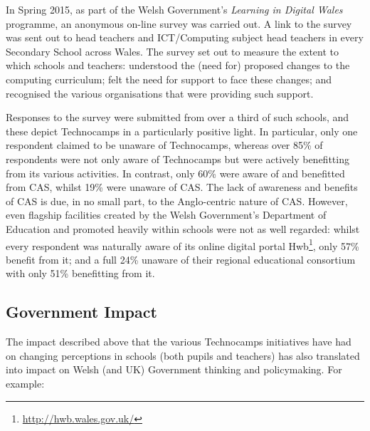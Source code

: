 \documentclass{llncs}
\begin{document}
In Spring 2015, as part of the Welsh Government's
\emph{Learning in Digital Wales} programme,
an anonymous on-line survey was carried out.
A link to the survey %
was sent out to head teachers and ICT/Computing subject head teachers
in every Secondary School across Wales.
The survey set out to measure the extent to which schools and teachers:
understood the (need for) proposed changes to the computing curriculum;
felt the need for support to face these changes;
and recognised the various organisations that were
providing such support.

Responses to the survey were submitted from over a third of such
schools, and these depict Technocamps in a particularly positive
light.  In particular, only one respondent claimed to be unaware of
Technocamps, whereas over 85\% of respondents were not only aware of
Technocamps but were actively benefitting from its various activities.
In contrast, only 60\% were aware of and benefitted from CAS, whilst
19\% were unaware of CAS. The lack of awareness and benefits of CAS is
due, in no small part, to the Anglo-centric nature of CAS.  However,
even flagship facilities created by the Welsh Government's Department
of Education and promoted heavily within schools were not as well
regarded: whilst every respondent was naturally aware of its online
digital portal Hwb\footnote{\url{http://hwb.wales.gov.uk/}}, only 57\%
benefit from it; and a full 24\% unaware of their regional educational
consortium with only 51\% benefitting from it.

\subsection{Government Impact}
\label{govrecog}

The impact described above that the various Technocamps initiatives
have had on changing perceptions in schools (both pupils and teachers)
has also translated into impact on Welsh (and UK) Government thinking
and policymaking. For example:
\end{document}
